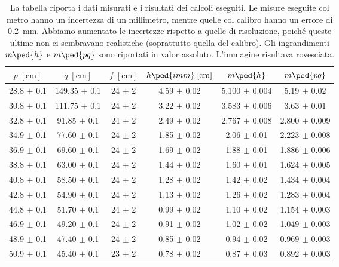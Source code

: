 
\begin{table}
    \centering
    \small
    \begin{tabular}{c c c c c c}
        \toprule
        $p \; [\si{\centi\metre}]$ & $q \; [\si{\centi\metre}]$ & $f \; [\si{\centi\metre}]$ &
        $h\ped{imm} \; [\si{\centi\metre}]$ & $m\ped{h}$ & $m\ped{pq}$ \\
        \midrule
        28.8 $\pm$ 0.1 & 149.35 $\pm$ 0.1 & 24 $\pm$ 2 & 4.59 $\pm$ 0.02 & 5.100 $\pm$ 0.004  & 5.19 $\pm$    0.02 \\
		30.8 $\pm$ 0.1 & 111.75 $\pm$ 0.1 & 24 $\pm$ 2 & 3.22 $\pm$ 0.02 & 3.583 $\pm$ 0.006  & 3.63 $\pm$   0.01  \\
		32.8 $\pm$ 0.1 & 91.85 $\pm$ 0.1 & 24 $\pm$ 2 & 2.49 $\pm$ 0.02 & 2.767 $\pm$  0.008   & 2.800 $\pm$  0.009 \\
		34.9 $\pm$ 0.1 & 77.60 $\pm$ 0.1 & 24 $\pm$ 2 & 1.85 $\pm$ 0.02 & 2.06 $\pm$  0.01    & 2.223 $\pm$  0.008 \\
		36.9 $\pm$ 0.1 & 69.60 $\pm$ 0.1 & 24 $\pm$ 2 & 1.69 $\pm$ 0.02 & 1.88 $\pm$  0.01    & 1.886 $\pm$  0.006 \\
		38.8 $\pm$ 0.1 & 63.00 $\pm$ 0.1 & 24 $\pm$ 2 & 1.44 $\pm$ 0.02 & 1.60 $\pm$  0.01    & 1.624 $\pm$  0.005 \\
		40.8 $\pm$ 0.1 & 58.50 $\pm$ 0.1 & 24 $\pm$ 2 & 1.28 $\pm$ 0.02 & 1.42 $\pm$  0.02    & 1.434 $\pm$  0.004 \\
		42.8 $\pm$ 0.1 & 54.90 $\pm$ 0.1 & 24 $\pm$ 2 & 1.13 $\pm$ 0.02 & 1.26 $\pm$   0.02     & 1.283 $\pm$ 0.004 \\
		44.8 $\pm$ 0.1 & 51.70 $\pm$ 0.1 & 24 $\pm$ 2 & 0.99 $\pm$ 0.02 & 1.10 $\pm$   0.02     & 1.154 $\pm$ 0.003 \\
		46.9 $\pm$ 0.1 & 49.20 $\pm$ 0.1 & 24 $\pm$ 2 & 0.91 $\pm$ 0.02 & 1.02 $\pm$   0.02     & 1.049 $\pm$ 0.003 \\
		48.9 $\pm$ 0.1 & 47.40 $\pm$ 0.1 & 24 $\pm$ 2 & 0.85 $\pm$ 0.02 & 0.94 $\pm$   0.02     & 0.969 $\pm$ 0.003 \\
		50.9 $\pm$ 0.1 & 45.40 $\pm$ 0.1 & 23 $\pm$ 2 & 0.78 $\pm$ 0.02 & 0.87 $\pm$   0.03     & 0.892 $\pm$ 0.003 \\
        \bottomrule
    \end{tabular}
    \caption{La tabella riporta i dati misurati e i risultati dei calcoli eseguiti. Le misure eseguite col metro
    hanno un incertezza di un millimetro, mentre quelle col calibro hanno un errore di \SI{0.2}{\milli\metre}. Abbiamo
    aumentato le incertezze rispetto a quelle di risoluzione, poiché queste ultime non ci sembravano realistiche (soprattutto
quella del calibro). Gli ingrandimenti $m\ped{h}$ e $m\ped{pq}$ sono riportati in valor assoluto. L'immagine risultava rovesciata.}
    \label{tab:conv}
\end{table}













